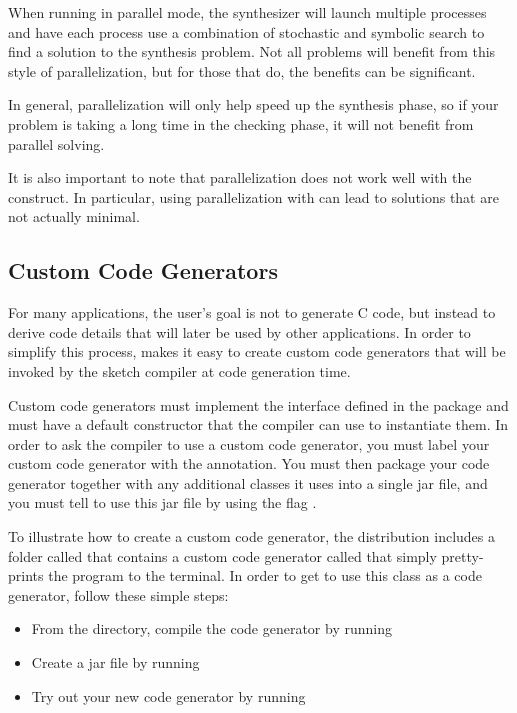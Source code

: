 When running in parallel mode, the \Sk{} synthesizer will launch multiple processes and have each process use a combination of stochastic and symbolic search to find a solution to the synthesis problem. Not all problems will benefit from this style of parallelization, but for those that do, the benefits can be significant. 

In general, parallelization will only help speed up the synthesis phase, so if your problem is taking a long time in the checking phase, it will not benefit from parallel solving. 

It is also important to note that parallelization does not work well with the  construct. In particular, using parallelization with  can lead to solutions that are not actually minimal. 


\subsection{Custom Code Generators}

For many applications, the user's goal is not to generate C code, but instead to derive code details that will later be used by other applications. In order to simplify this process, \Sk{} makes it easy to create custom code generators that will be invoked by the sketch compiler at code generation time. 

Custom code generators must implement the  interface defined in the  package and must have a default constructor that the compiler can use to instantiate them. In order to ask the compiler to use a custom code generator, you must label your custom code generator with the  annotation. You must then package your code generator together with any additional classes it uses into a single jar file, and you must tell \Sk{} to use this jar file by using the flag . 



To illustrate how to create a custom code generator, the \Sk{} distribution includes a folder called  that contains a custom code generator called  that simply pretty-prints the program to the terminal. In order to get \Sk{} to use this class as a code generator, follow these simple steps:

\begin{itemize}
\item From the  directory, compile the code generator by running \newline
 \version{}
\item Create a jar file by running \newline
{}
\item Try out your new code generator by running \newline
{}
\end{itemize}

